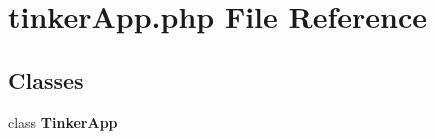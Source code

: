 \section{tinker\-App.php File Reference}
\label{tinkerApp_8php}
\subsection*{Classes}
\begin{CompactItemize}
\item 
class {\bf Tinker\-App}
\end{CompactItemize}

